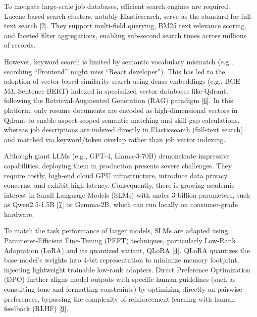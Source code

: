 \documentclass[12pt, a4paper]{report}
\begin{document}
\vspace{0.6cm}
\vspace{0.4cm}

To navigate large-scale job databases, efficient search engines are required. Lucene-based search clusters, notably Elasticsearch, serve as the standard for full-text search [\hyperlink{cite2}{2}]. They support multi-field querying, BM25 text relevance scoring, and faceted filter aggregations, enabling sub-second search times across millions of records.

However, keyword search is limited by semantic vocabulary mismatch (e.g., searching ``Frontend'' might miss ``React developer''). This has led to the adoption of vector-based similarity search using dense embeddings (e.g., BGE-M3, Sentence-BERT) indexed in specialized vector databases like Qdrant, following the Retrieval-Augmented Generation (RAG) paradigm [\hyperlink{cite6}{6}]. In this platform, only resume documents are encoded as high-dimensional vectors in Qdrant to enable aspect-scoped semantic matching and skill-gap calculations, whereas job descriptions are indexed directly in Elasticsearch (full-text search) and matched via keyword/token overlap rather than job vector indexing.

\vspace{0.6cm}
\vspace{0.4cm}

Although giant LLMs (e.g., GPT-4, Llama-3-70B) demonstrate impressive capabilities, deploying them in production presents severe challenges. They require costly, high-end cloud GPU infrastructure, introduce data privacy concerns, and exhibit high latency. Consequently, there is growing academic interest in Small Language Models (SLMs) with under 3 billion parameters, such as Qwen2.5-1.5B [\hyperlink{cite7}{7}] or Gemma-2B, which can run locally on consumer-grade hardware.

To match the task performance of larger models, SLMs are adapted using Parameter-Efficient Fine-Tuning (PEFT) techniques, particularly Low-Rank Adaptation (LoRA) and its quantized variant, QLoRA [\hyperlink{cite4}{4}]. QLoRA quantizes the base model's weights into 4-bit representation to minimize memory footprint, injecting lightweight trainable low-rank adapters. Direct Preference Optimization (DPO) further aligns model outputs with specific human guidelines (such as consulting tone and formatting constraints) by optimizing directly on pairwise preferences, bypassing the complexity of reinforcement learning with human feedback (RLHF) [\hyperlink{cite9}{9}].
\end{document}
